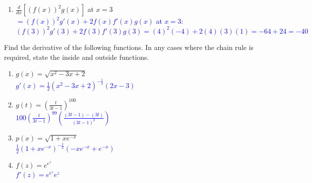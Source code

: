 \documentclass{ximera}
\begin{document}
\begin{exercise}
\begin{enumerate}
        \item[f.] $\frac{d}{dx}[(f(x))^2g(x)]$ at $x=3$\\
        \textcolor{blue}{ $=(f(x))^2g'(x)+2f(x)f'(x)g(x)$ at $x=3$: \\$(f(3))^2g'(3)+2f(3)f'(3)g(3)=(4)^2(-4)+2(4)(3)(1)=-64+24=-40$}

    \end{enumerate}
\end{exercise}

\begin{exercise}
Find the derivative of the following functions. In any cases where the chain rule is required, state the inside and outside functions.
    \begin{enumerate}

        \item $g(x)=\sqrt{x^2-3x+2}$ \\
        \textcolor{blue}{ $g'(x)=\frac12(x^2-3x+2)^{-\frac12}(2x-3)$}


        \item $g(t)=(\frac{t}{3t-1})^{100}$\\
        \textcolor{blue}{$100(\frac{t}{3t-1})^{99}(\frac{(3t-1)-(3t)}{(3t-1)^2})$}
        
        \item $p(x)=\sqrt{1+xe^{-x}}$\\
        \textcolor{blue}{$\frac{1}{2}(1+xe^{-x})^{-\frac12}(-xe^{-x}+e^{-x})$}
        

        \item $f(z)=e^{e^z}$\\
        \textcolor{blue}{ $f'(z)=e^{e^z}e^z$}
        
    \end{enumerate}

\end{exercise}
\end{document}
